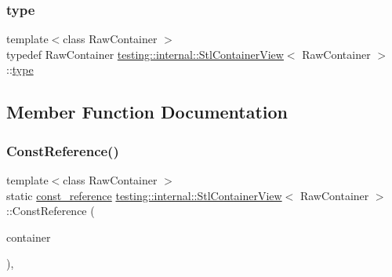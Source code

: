 \mbox{\label{classtesting_1_1internal_1_1_stl_container_view_a2b2c63a6dcdbfe63fb0ee121ebf463ba}} 
\subsubsection{\texorpdfstring{type}{type}\hspace{0.1cm}{\footnotesize\ttfamily [3/3]}}
{\footnotesize\ttfamily template$<$class Raw\+Container $>$ \\
typedef Raw\+Container \mbox{\hyperlink{classtesting_1_1internal_1_1_stl_container_view}{testing\+::internal\+::\+Stl\+Container\+View}}$<$ Raw\+Container $>$\+::\mbox{\hyperlink{classtesting_1_1internal_1_1_stl_container_view_a2b2c63a6dcdbfe63fb0ee121ebf463ba}{type}}}



\subsection{Member Function Documentation}
\mbox{\label{classtesting_1_1internal_1_1_stl_container_view_a36eccf53329730f6e55c12002128bf25}} 
\subsubsection{\texorpdfstring{ConstReference()}{ConstReference()}\hspace{0.1cm}{\footnotesize\ttfamily [1/3]}}
{\footnotesize\ttfamily template$<$class Raw\+Container $>$ \\
static \mbox{\hyperlink{classtesting_1_1internal_1_1_stl_container_view_a9cd4f6ed689b3938cdb7b3c4cbf1b36b}{const\+\_\+reference}} \mbox{\hyperlink{classtesting_1_1internal_1_1_stl_container_view}{testing\+::internal\+::\+Stl\+Container\+View}}$<$ Raw\+Container $>$\+::Const\+Reference (\begin{DoxyParamCaption}\item[{const Raw\+Container \&}]{container }\end{DoxyParamCaption})\hspace{0.3cm}{\ttfamily [inline]}, {\ttfamily [static]}}

